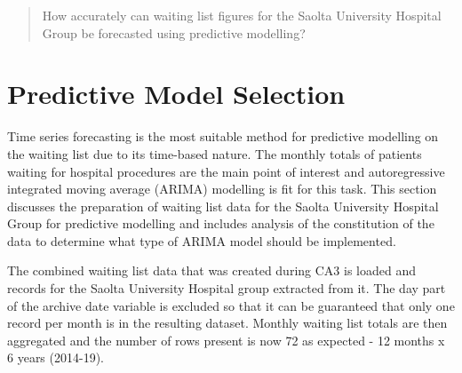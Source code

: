 \documentclass[
  12pt,
]{article}
\newenvironment{Shaded}{\begin{snugshade}}{\end{snugshade}}
\newcommand{\DataTypeTok}[1]{\textcolor[rgb]{0.13,0.29,0.53}{#1}}
\newcommand{\KeywordTok}[1]{\textcolor[rgb]{0.13,0.29,0.53}{\textbf{#1}}}
\newcommand{\NormalTok}[1]{#1}
\newcommand{\OperatorTok}[1]{\textcolor[rgb]{0.81,0.36,0.00}{\textbf{#1}}}
\newcommand{\StringTok}[1]{\textcolor[rgb]{0.31,0.60,0.02}{#1}}
\begin{document}
\begin{quote}
How accurately can waiting list figures for the Saolta University Hospital Group be forecasted using predictive modelling?
\end{quote}

\hypertarget{predictive-model-selection}{%
\section{Predictive Model Selection}\label{predictive-model-selection}}

\label{sec:selection}
Time series forecasting is the most suitable method for predictive modelling on the waiting list due to its time-based nature. The monthly totals of patients waiting for hospital procedures are the main point of interest and autoregressive integrated moving average (ARIMA) modelling is fit for this task. This section discusses the preparation of waiting list data for the Saolta University Hospital Group for predictive modelling and includes analysis of the constitution of the data to determine what type of ARIMA model should be implemented.

The combined waiting list data that was created during CA3 is loaded and records for the Saolta University Hospital group extracted from it. The day part of the archive date variable is excluded so that it can be guaranteed that only one record per month is in the resulting dataset. Monthly waiting list totals are then aggregated and the number of rows present is now 72 as expected - 12 months x 6 years (2014-19).
\small

\begin{Shaded}
\end{Shaded}
\end{document}
